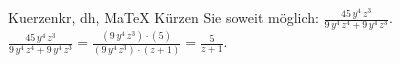 \begin{MAufgabe}{Kuerzen}{kr, dh, MaTeX}
K\"urzen Sie soweit m\"oglich: $\frac{45\, y^4\, z^3}{9\, y^4\, z^4 + 9\, y^4\, z^3}$.\\ 
\ifLsg\MLoesung
\quad $\frac{45\, y^4\, z^3}{9\, y^4\, z^4 + 9\, y^4\, z^3}=\frac{(9\, y^4\, z^3)\cdot(5)}{(9\, y^4\, z^3)\cdot(z + 1)}=\frac{5}{z + 1}$.\else\relax\fi
 \end{MAufgabe}